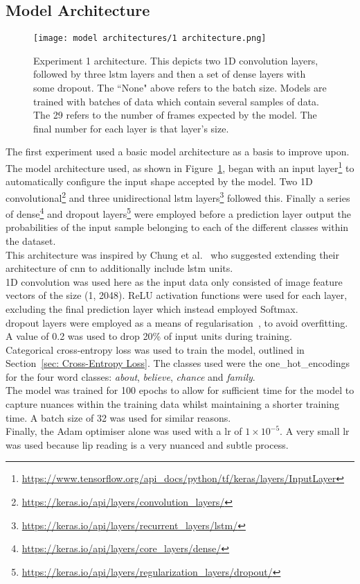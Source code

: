 \subsection{Model Architecture}
\begin{figure}
\centering
\texttt{[image: model architectures/1 architecture.png]}
\caption[Experiment 1 architecture]{Experiment 1 architecture. This depicts two 1D convolution layers, followed by three \acrshort{lstm} layers and then a set of dense layers with some dropout. The ``None" above refers to the batch size. Models are trained with batches of data which contain several samples of data. The 29 refers to the number of frames expected by the model. The final number for each layer is that layer's size.}
\label{fig:1 architecture}
\end{figure}
The first experiment used a basic model architecture as a basis to improve upon. The model architecture used, as shown in Figure~\ref{fig:1 architecture}, began with an input layer\footnote{\url{https://www.tensorflow.org/api_docs/python/tf/keras/layers/InputLayer}} to automatically configure the input shape accepted by the model. Two 1D convolutional\footnote{\url{https://keras.io/api/layers/convolution_layers/}} and three unidirectional \acrshort{lstm} layers\footnote{\url{https://keras.io/api/layers/recurrent_layers/lstm/}} followed this. Finally a series of dense\footnote{\url{https://keras.io/api/layers/core_layers/dense/}} and dropout layers\footnote{\url{https://keras.io/api/layers/regularization_layers/dropout/}} were employed before a prediction layer output the probabilities of the input sample belonging to each of the different classes within the dataset.\\
This architecture was inspired by Chung et al.~\cite{Lip-Reading-In-The-Wild} who suggested extending their architecture of \acrshort{cnn} to additionally include \acrshort{lstm} units.\\
1D convolution was used here as the input data only consisted of image feature vectors of the size (1, 2048). ReLU activation functions were used for each layer, excluding the final prediction layer which instead employed Softmax.\\
\Gls{dropout} layers were employed as a means of regularisation~\cite{regularization_for_DL, dropout_for_overfitting}, to avoid \gls{overfitting}. A value of 0.2 was used to drop 20\% of input units during training.\\
Categorical cross-entropy loss was used to train the model, outlined in Section~\ref{sec: Cross-Entropy Loss}. The classes used were the \gls{one_hot_encoding}s for the four word classes: \emph{about}, \emph{believe}, \emph{chance} and \emph{family}.\\
The model was trained for 100 epochs to allow for sufficient time for the model to capture nuances within the training data whilst maintaining a shorter training time. A batch size of 32 was used for similar reasons.\\
Finally, the Adam optimiser alone was used with a \acrshort{lr} of $1\times10^{-5}$. A very small \acrshort{lr} was used because lip reading is a very nuanced and subtle process.
